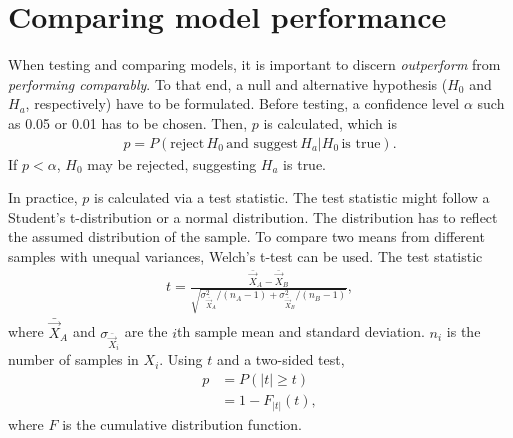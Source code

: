 \section{Comparing model performance}
When testing and comparing models, it is important to discern \emph{outperform} from \emph{performing comparably}.
To that end, a null and alternative hypothesis ($H_0$ and $H_a$, respectively) have to be formulated.
Before testing, a confidence level $\alpha$ such as 0.05 or 0.01 has to be chosen.
Then, $p$ is calculated, which is
\begin{align}
    p = P(\text{reject}\, H_0\, \text{and suggest}\, H_a | H_0\, \text{is true}).
\end{align}
If $p < \alpha$, $H_0$ may be rejected, suggesting $H_a$ is true.

In practice, $p$ is calculated via a test statistic.
The test statistic might follow \eg a Student's t-distribution or a normal distribution.
The distribution has to reflect the assumed distribution of the sample.
To compare two means from different samples with unequal variances, Welch's t-test can be used.
The test statistic
\begin{align}
    t = \frac{\bar{\vec{X}}_A - \bar{\vec{X}}_B}{\sqrt{\sigma^2_{\bar{\vec{X}}_A} / (n_A - 1) + \sigma^2_{\bar{\vec{X}}_B} / (n_B - 1)}},
\end{align}
where $\bar{\vec{X}}_A$ and $\sigma_{\bar{\vec{X}}_i}$ are the $i$th sample mean and standard deviation.
$n_i$ is the number of samples in $X_i$.
Using $t$ and a two-sided test,
\begin{align}
    p &= P(|t| \geq t) \\
    &= 1 - F_{|t|}(t),
\end{align}
where $F$ is the cumulative distribution function.

